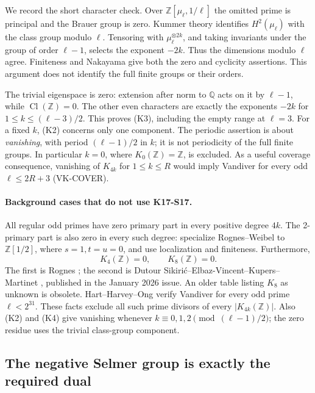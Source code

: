 We record the short character check. Over
\(\mathbb Z[\mu_\ell,1/\ell]\) the omitted prime is principal and the
Brauer group is zero. Kummer theory identifies \(H^2(\mu_\ell)\)
with the class group modulo \(\ell\). Tensoring with
\(\mu_\ell^{\otimes2k}\), and taking invariants under the group of
order \(\ell-1\), selects the exponent \(-2k\). Thus the dimensions
modulo \(\ell\) agree. Finiteness and Nakayama give both the zero
and cyclicity assertions. This argument does not identify the full
finite groups or their orders.

The trivial eigenspace is zero: extension after norm to
\(\mathbb Q\) acts on it by \(\ell-1\), while
\(\operatorname{Cl}(\mathbb Z)=0\). The other even characters are
exactly the exponents \(-2k\) for
\(1\le k\le(\ell-3)/2\). This proves (K3), including the empty range
at \(\ell=3\). For a fixed \(k\), (K2) concerns only one component.
The periodic assertion is about \emph{vanishing}, with period
\((\ell-1)/2\) in \(k\); it is not periodicity of the full finite
groups. In particular \(k=0\), where \(K_0(\mathbb Z)=\mathbb Z\),
is excluded. As a useful coverage consequence, vanishing of
\(K_{4k}\) for \(1\le k\le R\) would imply Vandiver for
every odd \(\ell\le2R+3\) (VK-COVER).

\paragraph{Background cases that do not use K17-S17.}
All regular odd primes have zero primary part in every positive
degree \(4k\). The 2-primary part is also zero in every such degree:
specialize Rognes--Weibel \cite[Theorem~0.7, proved as
Theorem~7.11]{RognesWeibel2000} to \(\mathbb Z[1/2]\), where
\(s=1,t=u=0\), and use localization and finiteness.
Furthermore,
\[
 K_4(\mathbb Z)=0,\qquad K_8(\mathbb Z)=0.              \tag{K4}
\]
The first is Rognes \cite[Theorem~0.1, p.~268]{Rognes2000};
the second is Dutour Sikiri\'c--Elbaz-Vincent--Kupers--Martinet
\cite[Theorem~6.4]{DEKM2026}, published in the January 2026 issue.
An older table listing \(K_8\) as unknown is obsolete.
Hart--Harvey--Ong \cite[\S1, item~(2)]{HartHarveyOng2017}
verify Vandiver for every odd prime \(\ell<2^{31}\).
These facts exclude all such prime divisors of every
\(|K_{4k}(\mathbb Z)|\). Also (K2) and (K4) give vanishing whenever
\(k\equiv0,1,2\pmod{(\ell-1)/2}\); the zero residue uses the
trivial class-group component.

\subsection{The negative Selmer group is exactly the required dual}

